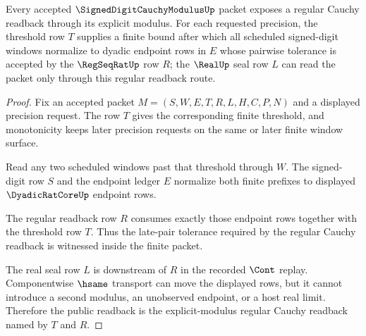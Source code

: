 \begin{theorem}
\label{thm:signed-digit-cauchy-modulus-regular-readback}
Every accepted $\SignedDigitCauchyModulusUp$ packet exposes a regular Cauchy readback through its explicit modulus. For each requested precision, the threshold row $T$ supplies a finite bound after which all scheduled signed-digit windows normalize to dyadic endpoint rows in $E$ whose pairwise tolerance is accepted by the $\RegSeqRatUp$ row $R$; the $\RealUp$ seal row $L$ can read the packet only through this regular readback route.
\end{theorem}
\begin{proof}
Fix an accepted packet $M=(S,W,E,T,R,L,H,C,P,N)$ and a displayed precision request. The row $T$ gives the corresponding finite threshold, and monotonicity keeps later precision requests on the same or later finite window surface.

Read any two scheduled windows past that threshold through $W$. The signed-digit row $S$ and the endpoint ledger $E$ normalize both finite prefixes to displayed $\DyadicRatCoreUp$ endpoint rows.

The regular readback row $R$ consumes exactly those endpoint rows together with the threshold row $T$. Thus the late-pair tolerance required by the regular Cauchy readback is witnessed inside the finite packet.

The real seal row $L$ is downstream of $R$ in the recorded $\Cont$ replay. Componentwise $\hsame$ transport can move the displayed rows, but it cannot introduce a second modulus, an unobserved endpoint, or a host real limit. Therefore the public readback is the explicit-modulus regular Cauchy readback named by $T$ and $R$.
\end{proof}

